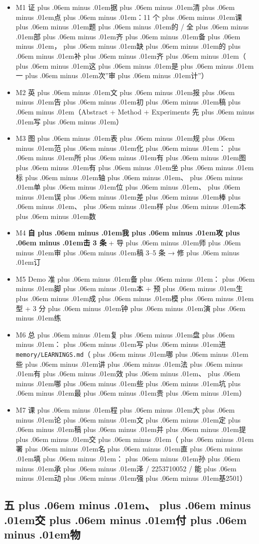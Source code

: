 \documentclass[
]{article}
\newcommand{\passthrough}[1]{#1}
\providecommand{\tightlist}{%
  \setlength{\itemsep}{0pt}\setlength{\parskip}{0pt}}
\def\zh#1{{\zhfont #1}}
\def\sym#1{{\symfont #1}}
\def\codezh#1{{\zhmonofont #1}}
\def\zhglue{\hskip0pt plus .06em minus .01em}
\begin{document}
\begin{itemize}
\tightlist
\item[$\square$]
  M1 \zh{证\zhglue 据\zhglue 清\zhglue 点\zhglue ：}11 \zh{个\zhglue 课\zhglue 题\zhglue 的} \passthrough{\codezh{{\zh{证}}{\zh{据}}/}} \zh{全\zhglue 部\zhglue 齐\zhglue 备\zhglue ，\zhglue 缺\zhglue 的\zhglue 补\zhglue 齐\zhglue （\zhglue 这\zhglue 是\zhglue 一\zhglue 次}''\zh{审\zhglue 计}''\zh{）}
\item[$\square$]
  M2 \zh{英\zhglue 文\zhglue 报\zhglue 告\zhglue 初\zhglue 稿\zhglue （}Abstract + Method + Experiments \zh{先\zhglue 写\zhglue ）}
\item[$\square$]
  M3 \zh{图\zhglue 表\zhglue 规\zhglue 范\zhglue 化\zhglue ：\zhglue 所\zhglue 有\zhglue 图\zhglue 有\zhglue 坐\zhglue 标\zhglue 轴\zhglue 、\zhglue 单\zhglue 位\zhglue 、\zhglue 误\zhglue 差\zhglue 棒\zhglue 、\zhglue 样\zhglue 本\zhglue 数}
\item[$\square$]
  M4 \textbf{\zh{自\zhglue 我\zhglue 攻\zhglue 击} 3 \zh{条}} + \zh{导\zhglue 师\zhglue 审\zhglue 稿} 3--5 \zh{条} \sym{→} \zh{修\zhglue 订}
\item[$\square$]
  M5 Demo \zh{准\zhglue 备\zhglue ：\zhglue 脚\zhglue 本} + \zh{预\zhglue 生\zhglue 成\zhglue 模\zhglue 型} + 3 \zh{分\zhglue 钟\zhglue 演\zhglue 练}
\item[$\square$]
  M6 \zh{总\zhglue 复\zhglue 盘\zhglue ：\zhglue 写\zhglue 进} \passthrough{\lstinline!memory/LEARNINGS.md!}\zh{（\zhglue 哪\zhglue 些\zhglue 讲\zhglue 法\zhglue 有\zhglue 效\zhglue 、\zhglue 哪\zhglue 些\zhglue 坑\zhglue 最\zhglue 贵\zhglue ）}
\item[$\square$]
  M7 \zh{课\zhglue 程\zhglue 大\zhglue 论\zhglue 文\zhglue 定\zhglue 稿\zhglue 并\zhglue 提\zhglue 交\zhglue （\zhglue 署\zhglue 名\zhglue 直\zhglue 填\zhglue ：\zhglue 孙\zhglue 承\zhglue 泽} / 2253710052 / \zh{能\zhglue 动\zhglue 强\zhglue 基}2501\zh{）}
\end{itemize}

\subsection{\zh{五\zhglue 、\zhglue 交\zhglue 付\zhglue 物}}\label{ux4e94ux4ea4ux4ed8ux7269}
\end{document}
